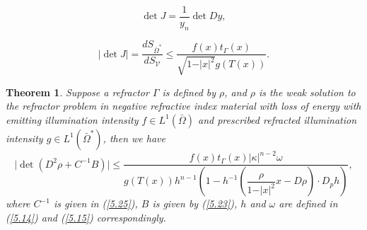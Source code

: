 \documentclass[10pt,a4paper]{amsart}
\newtheorem{theorem}{Theorem}
\begin{document}
\begin{equation}\label{5.2}
  \det J = \frac{1}{y_{n}} \det Dy,
\end{equation}

\begin{equation}\label{5.5}
   \vert \det J \vert = \frac{dS_{\bar{\Omega}^{\ast}}}{dS_{\mathcal{V}}} \leq \frac{f(x)t_{\Gamma}(x)}{\sqrt{1 - \vert x \vert^{2}}g(T(x))}.
\end{equation}

\begin{theorem}
  Suppose a refractor $\Gamma$ is defined by $\rho$, and $\rho$ is the weak solution to the refractor problem in negative refractive index material with loss of energy with emitting illumination intensity $f \in L^{1}(\bar{\Omega})$ and prescribed refracted illumination intensity $g \in L^{1}(\bar{\Omega}^{\ast})$, then we have
  \begin{equation}\label{5.6}
    \vert \det (D^{2}\rho + C^{-1}B) \vert \leq \frac{f(x)t_{\Gamma}(x)\vert \kappa \vert^{n - 2} \omega}{g(T(x))h^{n - 1}\left(1 - h^{-1}\left(\dfrac{\rho}{1 - \vert x \vert^{2}}x - D\rho\right)\cdot D_{p}h\right)},
  \end{equation}
  where $C^{-1}$ is given in (\ref{5.25}), $B$ is given by (\ref{5.23}), $h$ and $\omega$ are defined in (\ref{5.14}) and (\ref{5.15}) correspondingly.
  \label{thm5.1}
\end{theorem}
\end{document}
